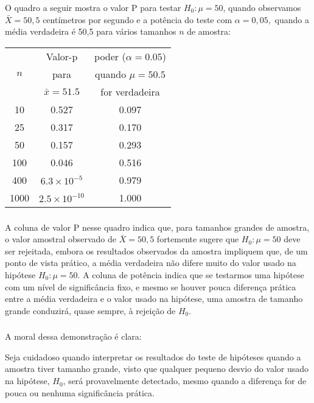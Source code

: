 \documentclass[14pt,aspectratio=1610]{beamer}
\newcommand{\bx}{\ensuremath{\bar{x}}}
\newcommand{\Ho}{\ensuremath{H_{0}}}
\begin{document}
\begin{frame}{}
\frametitle{}
\begin{block}{}
\justifying
O quadro a seguir mostra o valor P para testar $\Ho: \mu = 50$, quando observamos $\bar{X} = 50,5$ centímetros por segundo e a potência do teste com $\alpha = 0,05,$ 
quando a média verdadeira é 50,5 para vários tamanhos $n$ de amostra:
\begin{table}[]
\begin{tabular}{|c|c|c|}
\hline
 & Valor-p  & poder ($\alpha=0.05$)  \\ 
$n$ & para                                & quando $\mu=50.5$ \\ 
       & $\bx=51.5$                    &  for verdadeira \\ \hline
10   & 0.527                            & 0.097 \\ \hline
25   & 0.317                             & 0.170 \\ \hline
50   & 0.157                            & 0.293 \\ \hline
100 & 0.046                            & 0.516 \\ \hline
400 & $6.3\times 10^{-5}$     &  0.979  \\ \hline
1000 & $2.5\times 10^{-10}$ & 1.000 \\ \hline
\end{tabular}
\end{table}
\end{block}
\end{frame}

\begin{frame}{}
\frametitle{}
\begin{block}{}
\justifying
A coluna de valor P nesse quadro indica que, para tamanhos grandes de amostra, o valor amostral observado de $ \bar{X}= 50,5$ fortemente sugere que $\Ho: \mu = 50$ 
deve ser rejeitada, embora os resultados observados da amostra impliquem que, de um ponto de vista prático, a média verdadeira não difere muito do valor usado na 
hipótese $\Ho:\mu = 50$. A coluna de potência indica que se testarmos uma hipótese com um nível de significância fixo, e mesmo se houver pouca diferença prática 
entre a média verdadeira e o valor usado na hipótese, uma amostra de tamanho grande conduzirá, quase sempre, à rejeição de $\Ho$. 
\end{block}
\end{frame}

\begin{frame}{}
\frametitle{}
\begin{block}{}
\justifying
A moral dessa demonstração é clara:
\end{block}
\pause
\begin{block}{}
\justifying
Seja cuidadoso quando interpretar os resultados do teste de hipóteses quando a amostra tiver tamanho grande, visto que qualquer pequeno desvio do valor usado na 
hipótese, $\Ho$, será provavelmente detectado, mesmo quando a diferença for de pouca ou nenhuma significância prática.
\end{block}
\end{frame}
\end{document}
